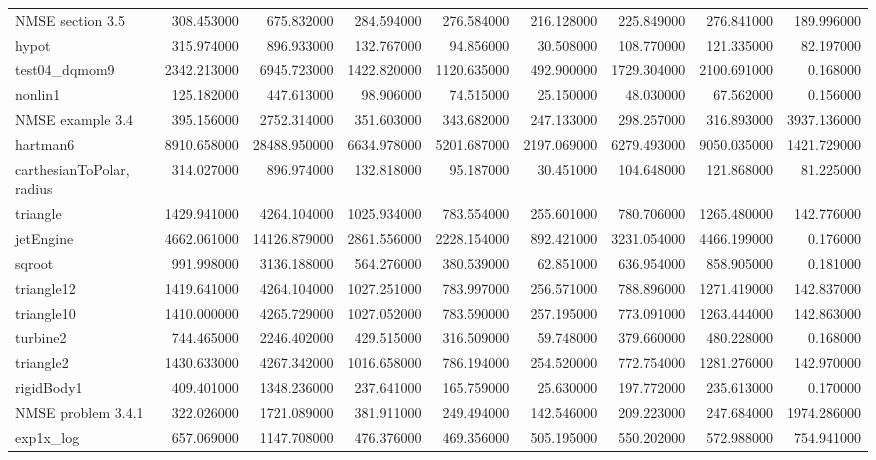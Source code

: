 \begin{longtable}{lrrrrrrrr}
NMSE section 3.5 & 308.453000 & 675.832000 & 284.594000 & 276.584000 & 216.128000 & 225.849000 & 276.841000 & 189.996000 \\
hypot & 315.974000 & 896.933000 & 132.767000 & 94.856000 & 30.508000 & 108.770000 & 121.335000 & 82.197000 \\
test04\_dqmom9 & 2342.213000 & 6945.723000 & 1422.820000 & 1120.635000 & 492.900000 & 1729.304000 & 2100.691000 & 0.168000 \\
nonlin1 & 125.182000 & 447.613000 & 98.906000 & 74.515000 & 25.150000 & 48.030000 & 67.562000 & 0.156000 \\
NMSE example 3.4 & 395.156000 & 2752.314000 & 351.603000 & 343.682000 & 247.133000 & 298.257000 & 316.893000 & 3937.136000 \\
hartman6 & 8910.658000 & 28488.950000 & 6634.978000 & 5201.687000 & 2197.069000 & 6279.493000 & 9050.035000 & 1421.729000 \\
carthesianToPolar, radius & 314.027000 & 896.974000 & 132.818000 & 95.187000 & 30.451000 & 104.648000 & 121.868000 & 81.225000 \\
triangle & 1429.941000 & 4264.104000 & 1025.934000 & 783.554000 & 255.601000 & 780.706000 & 1265.480000 & 142.776000 \\
jetEngine & 4662.061000 & 14126.879000 & 2861.556000 & 2228.154000 & 892.421000 & 3231.054000 & 4466.199000 & 0.176000 \\
sqroot & 991.998000 & 3136.188000 & 564.276000 & 380.539000 & 62.851000 & 636.954000 & 858.905000 & 0.181000 \\
triangle12 & 1419.641000 & 4264.104000 & 1027.251000 & 783.997000 & 256.571000 & 788.896000 & 1271.419000 & 142.837000 \\
triangle10 & 1410.000000 & 4265.729000 & 1027.052000 & 783.590000 & 257.195000 & 773.091000 & 1263.444000 & 142.863000 \\
turbine2 & 744.465000 & 2246.402000 & 429.515000 & 316.509000 & 59.748000 & 379.660000 & 480.228000 & 0.168000 \\
triangle2 & 1430.633000 & 4267.342000 & 1016.658000 & 786.194000 & 254.520000 & 772.754000 & 1281.276000 & 142.970000 \\
rigidBody1 & 409.401000 & 1348.236000 & 237.641000 & 165.759000 & 25.630000 & 197.772000 & 235.613000 & 0.170000 \\
NMSE problem 3.4.1 & 322.026000 & 1721.089000 & 381.911000 & 249.494000 & 142.546000 & 209.223000 & 247.684000 & 1974.286000 \\
exp1x\_log & 657.069000 & 1147.708000 & 476.376000 & 469.356000 & 505.195000 & 550.202000 & 572.988000 & 754.941000 \\

\end{longtable}

